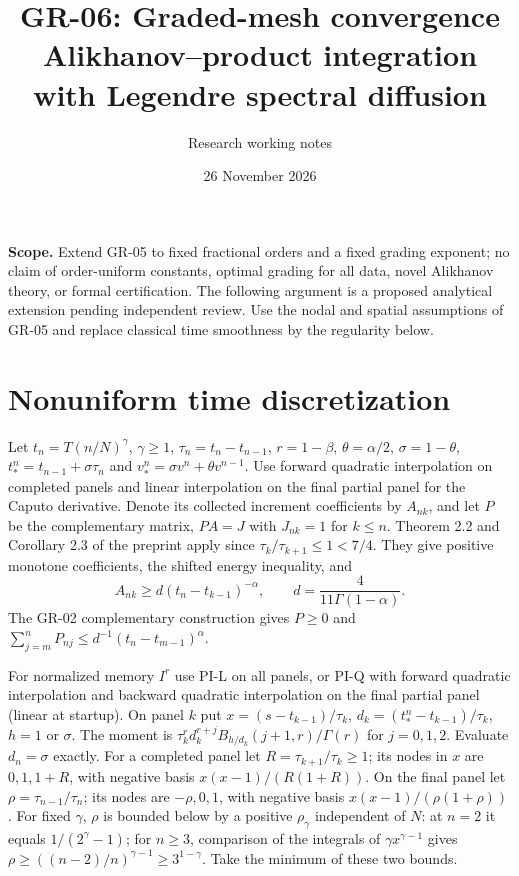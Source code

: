 \documentclass[11pt,a4paper]{article}
\title{GR-06: Graded-mesh convergence\\\large Alikhanov--product integration with Legendre spectral diffusion}
\author{Research working notes}
\date{26 November 2026}
\begin{document}
\maketitle
\noindent\textbf{Scope.} Extend GR-05 to fixed fractional orders and a fixed grading exponent; no claim of order-uniform constants, optimal grading for all data, novel Alikhanov theory, or formal certification. The following argument is a proposed analytical extension pending independent review. Use the nodal and spatial assumptions of GR-05 and replace classical time smoothness by the regularity below.
\section{Nonuniform time discretization}
Let $t_n=T(n/N)^\gamma$, $\gamma\ge1$, $\tau_n=t_n-t_{n-1}$, $r=1-\beta$, $\theta=\alpha/2$, $\sigma=1-\theta$, $t_*^n=t_{n-1}+\sigma\tau_n$ and $v_*^n=\sigma v^n+\theta v^{n-1}$. Use forward quadratic interpolation on completed panels and linear interpolation on the final partial panel for the Caputo derivative. Denote its collected increment coefficients by $A_{nk}$, and let $P$ be the complementary matrix, $PA=J$ with $J_{nk}=1$ for $k\le n$. Theorem 2.2 and Corollary 2.3 of the preprint \cite{lmz} apply since $\tau_k/\tau_{k+1}\le1<7/4$. They give positive monotone coefficients, the shifted energy inequality, and
\[
 A_{nk}\ge d(t_n-t_{k-1})^{-\alpha},\qquad d=\frac4{11\Gamma(1-\alpha)}.
\]
The GR-02 complementary construction gives $P\ge0$ and $\sum_{j=m}^nP_{nj}\le d^{-1}(t_n-t_{m-1})^\alpha$.

For normalized memory $I^r$ use PI-L on all panels, or PI-Q with forward quadratic interpolation and backward quadratic interpolation on the final partial panel (linear at startup). On panel $k$ put $x=(s-t_{k-1})/\tau_k$, $d_k=(t_*^n-t_{k-1})/\tau_k$, $h=1$ or $\sigma$. The moment is $\tau_k^r d_k^{r+j} B_{h/d_k}(j+1,r)/\Gamma(r)$ for $j=0,1,2$. Evaluate $d_n=\sigma$ exactly. For a completed panel let $R=\tau_{k+1}/\tau_k\ge1$; its nodes in $x$ are $0,1,1+R$, with negative basis $x(x-1)/(R(1+R))$. On the final panel let $\rho=\tau_{n-1}/\tau_n$; its nodes are $-\rho,0,1$, with negative basis $x(x-1)/(\rho(1+\rho))$. For fixed $\gamma$, $\rho$ is bounded below by a positive $\rho_\gamma$ independent of $N$: at $n=2$ it equals $1/(2^\gamma-1)$; for $n\ge3$, comparison of the integrals of $\gamma x^{\gamma-1}$ gives $\rho\ge((n-2)/n)^{\gamma-1}\ge3^{1-\gamma}$. Take the minimum of these two bounds.
\end{document}
